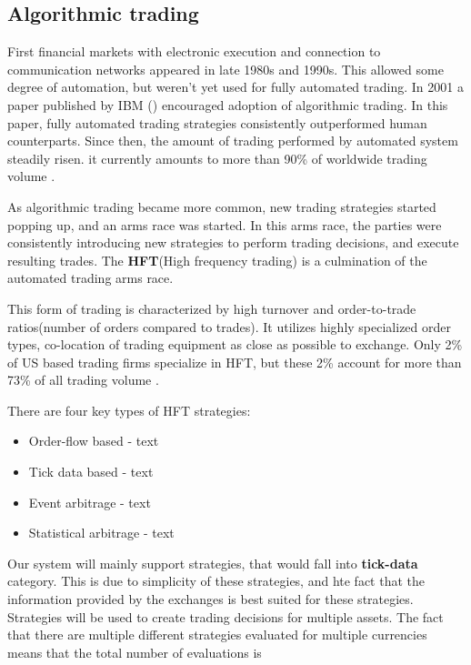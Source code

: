 \subsection{Algorithmic trading}
First financial markets with electronic execution and connection to communication networks appeared
in late 1980s and 1990s. This allowed some degree of automation, but weren't yet used for fully
automated trading. In 2001 a paper published by IBM ()
encouraged adoption of algorithmic trading. In this paper, fully automated trading strategies
consistently outperformed human counterparts. Since then, the amount of trading performed by
automated system steadily risen. it currently amounts to more than 90\% of worldwide
trading volume .

As algorithmic trading became more common, new trading strategies started popping up, and
an arms race was started. In this arms race, the parties were consistently introducing new
strategies to perform trading decisions, and execute resulting trades. The \textbf{HFT}(High frequency trading)
is a culmination of the automated trading arms race.

This form of trading is characterized by high turnover and order-to-trade ratios(number of orders compared to trades).
It utilizes highly specialized order types, co-location of trading equipment as close as possible to exchange.
Only 2\% of US based trading firms specialize in HFT, but these 2\% account for more than 73\% of all
trading volume .

There are four key types of HFT strategies:
\begin{itemize}
    \item {Order-flow based - text }
    \item {Tick data based - text }
    \item {Event arbitrage - text}
    \item {Statistical arbitrage - text }
\end{itemize}



Our system will mainly support strategies, that would fall into \textbf{tick-data} category. This is due
to simplicity of these strategies, and hte fact that the information provided by the exchanges is best suited
for these strategies. Strategies will be used to create trading decisions for multiple assets. The fact that
there are multiple different strategies evaluated for multiple currencies means that the total number of evaluations is


